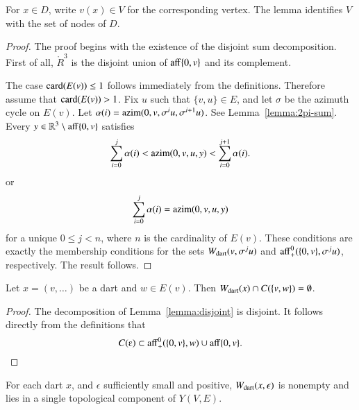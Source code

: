For $x\in D$, write $v(x)\in V$ for the corresponding vertex.  The lemma identifies $V$ with the set of nodes of $D$.

\begin{proof}
The proof begins with the existence of the disjoint sum decomposition.
First of all, $\ring{R}^3$ is the disjoint union of ${\operatorname{aff}}\{0,v\}$
and its complement.

The case ${\operatorname{card}}(E(v))\le 1$ follows immediately from the definitions.  
Therefore assume  that ${\operatorname{card}}(E(v)) >1$.
Fix $u$ such that $\{v,u\}\in E$, and let $\sigma$ be the azimuth
cycle on $E(v)$.  Let $\alpha(i)={\operatorname{azim}}(0,v,\sigma^i u,\sigma^{i+1}u)$.   See Lemma~\ref{lemma:2pi-sum}.  Every $y\in\mathbb{R}^3\setminus{\operatorname{aff}}\{0,v\}$ satisfies
$$
\sum_{i=0}^j \alpha(i) <
{\operatorname{azim}}(0,v,u,y) < \sum_{i=0}^{j+1} \alpha(i).
$$
or 
$$
\sum_{i=0}^j \alpha(i) = {\operatorname{azim}}(0,v,u,y)
$$
for a unique $0 \le j < n$, where $n$ is the cardinality of $E(v)$. 
These conditions are exactly the membership conditions for the sets
$
W_{\text{dart}}(v,\sigma^j u)
$
and ${\operatorname{aff}}_+^0(\{0,v\},\sigma^j u)$, respectively.
The result follows.
\end{proof}

\begin{corollary}
Let $x = (v,\ldots)$ be a dart and $w\in E(v)$.
Then $W_{\text{dart}}(x)\cap C(\{v,w\})=\emptyset$.
\end{corollary}

\begin{proof} The decomposition of Lemma~\ref{lemma:disjoint} is
disjoint.  It follows directly from the definitions that
   $$C(\e)\subset \op{aff}_+^0(\{\orz,v\},w) \cup 
    \op{aff}\{\orz,v\}.$$
\end{proof}

\begin{lemma} 
For each dart $x$, and $\epsilon$ sufficiently small and positive,
$W_{\text{dart}}(x,\epsilon)$ is nonempty and lies in a single 
topological component of $Y(V,E)$.
\end{lemma}

